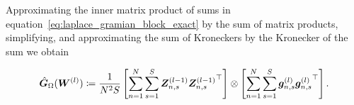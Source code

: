 %


Approximating the inner matrix product of sums in equation~\eqref{eq:laplace_gramian_block_exact} by the sum of matrix products, simplifying, and approximating the sum of Kroneckers by the Kronecker of the sum we obtain 
\begin{tcolorbox}[colframe=kfac, title={KFAC for ENGD with the Laplace operator},bottom=0mm,top=0mm,middle=0mm]
\begin{align}\label{eq:KFAC-PINN}
    \hat{\mG}_\Omega%
    (\mW^{(l)})
    \coloneqq \frac{1}{N^2 S}
    \left[\sum_{n=1}^N \sum_{s=1}^S \mZ^{(l-1)}_{n,s}{\mZ^{(l-1)}_{n,s}}^\top \right]
    \otimes
    \left[\sum_{n=1}^N\sum_{s=1}^S \vg^{(l)}_{n,s}{\vg^{(l)}_{n,s}}^\top   \right].
\end{align}
\end{tcolorbox}








